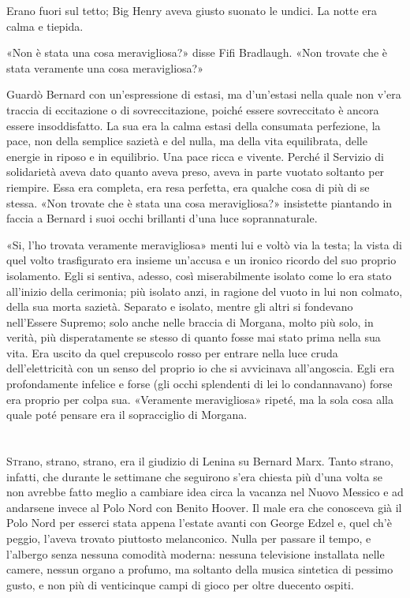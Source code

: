 \documentclass[
a5paper, %
10pt, %
twoside, 
onecolumn, %
openany, %
]{memoir}
\begin{document}
Erano fuori sul tetto; Big Henry aveva giusto suonato le undici. La notte era calma e tiepida.

«Non è stata una cosa meravigliosa?» disse Fifi Bradlaugh. «Non trovate che è stata veramente una cosa meravigliosa?»

Guardò Bernard con un’espressione di estasi, ma d’un’estasi nella quale non v’era traccia di eccitazione o di sovreccitazione, poiché essere sovreccitato è ancora essere insoddisfatto. La sua era la calma estasi della consumata perfezione, la pace, non della semplice sazietà e del nulla, ma della vita equilibrata, delle energie in riposo e in equilibrio. Una pace ricca e vivente. Perché il Servizio di solidarietà aveva dato quanto aveva preso, aveva in parte vuotato soltanto per riempire. Essa era completa, era resa perfetta, era qualche cosa di più di se stessa. «Non trovate che è stata una cosa meravigliosa?» insistette piantando in faccia a Bernard i suoi occhi brillanti d’una luce soprannaturale.

«Si, l’ho trovata veramente meravigliosa» menti lui e voltò via la testa; la vista di quel volto trasfigurato era insieme un’accusa e un ironico ricordo del suo proprio isolamento. Egli si sentiva, adesso, così miserabilmente isolato come lo era stato all’inizio della cerimonia; più isolato anzi, in ragione del vuoto in lui non colmato, della sua morta sazietà. Separato e isolato, mentre gli altri si fondevano nell’Essere Supremo; solo anche nelle braccia di Morgana, molto più solo, in verità, più disperatamente se stesso di quanto fosse mai stato prima nella sua vita. Era uscito da quel crepuscolo rosso per entrare nella luce cruda dell’elettricità con un senso del proprio io che si avvicinava all’angoscia. Egli era profondamente infelice e forse (gli occhi splendenti di lei lo condannavano) forse era proprio per colpa sua. «Veramente meravigliosa» ripeté, ma la sola cosa alla quale poté pensare era il sopracciglio di Morgana.

\chapter{\phantom{title}}

\begin{center}
    {\huge\textbf{}}
\end{center}

\lettrine{S}trano, strano, strano, era il giudizio di Lenina su Bernard Marx. Tanto strano, infatti, che durante le settimane che seguirono s’era chiesta più d’una volta se non avrebbe fatto meglio a cambiare idea circa la vacanza nel Nuovo Messico e ad andarsene invece al Polo Nord con Benito Hoover. Il male era che conosceva già il Polo Nord per esserci stata appena l’estate avanti con George Edzel e, quel ch’è peggio, l’aveva trovato piuttosto melanconico. Nulla per passare il tempo, e l’albergo senza nessuna comodità moderna: nessuna televisione installata nelle camere, nessun organo a profumo, ma soltanto della musica sintetica di pessimo gusto, e non più di venticinque campi di gioco per oltre duecento ospiti.
\end{document}
